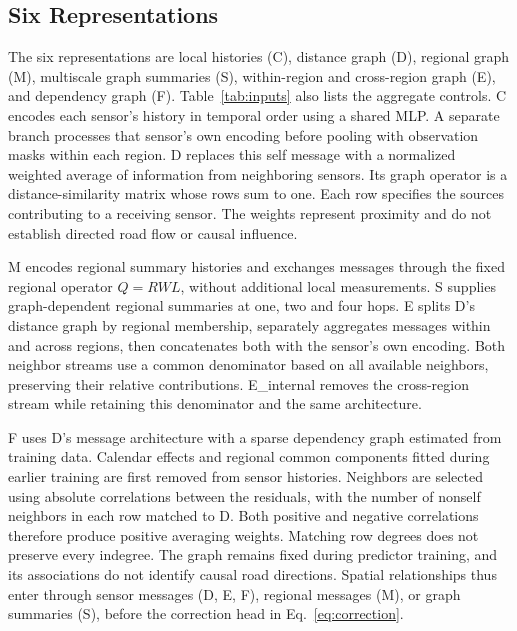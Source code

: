 \documentclass{llncs}
\begin{document}
\subsection{Six Representations}
The six representations are local histories (C), distance graph (D), regional graph (M), multiscale graph summaries (S), within-region and cross-region graph (E), and dependency graph (F). Table~\ref{tab:inputs} also lists the aggregate controls. C encodes each sensor's history in temporal order using a shared MLP. A separate branch processes that sensor's own encoding before pooling with observation masks within each region. D replaces this self message with a normalized weighted average of information from neighboring sensors. Its graph operator is a distance-similarity matrix whose rows sum to one. Each row specifies the sources contributing to a receiving sensor. The weights represent proximity and do not establish directed road flow or causal influence.

M encodes regional summary histories and exchanges messages through the fixed regional operator $Q=RWL$, without additional local measurements. S supplies graph-dependent regional summaries at one, two and four hops. E splits D's distance graph by regional membership, separately aggregates messages within and across regions, then concatenates both with the sensor's own encoding. Both neighbor streams use a common denominator based on all available neighbors, preserving their relative contributions. E\_internal removes the cross-region stream while retaining this denominator and the same architecture.

F uses D's message architecture with a sparse dependency graph estimated from training data. Calendar effects and regional common components fitted during earlier training are first removed from sensor histories. Neighbors are selected using absolute correlations between the residuals, with the number of nonself neighbors in each row matched to D. Both positive and negative correlations therefore produce positive averaging weights. Matching row degrees does not preserve every indegree. The graph remains fixed during predictor training, and its associations do not identify causal road directions. Spatial relationships thus enter through sensor messages (D, E, F), regional messages (M), or graph summaries (S), before the correction head in Eq.~\ref{eq:correction}.
\end{document}
